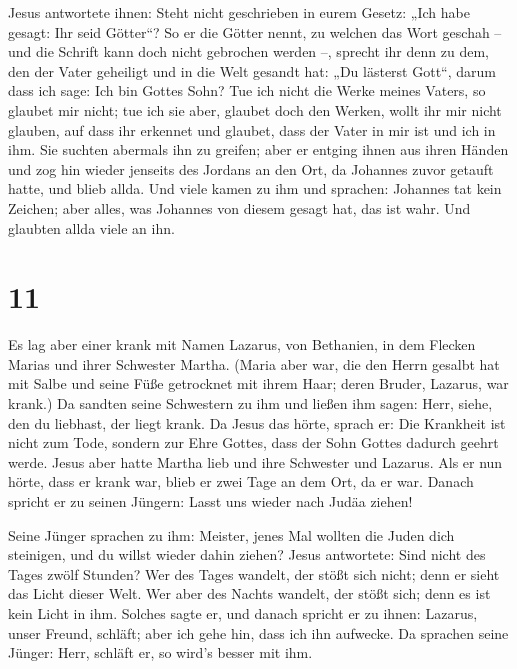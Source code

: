  Jesus antwortete ihnen: Steht nicht geschrieben in eurem
Gesetz: „Ich habe gesagt: Ihr seid Götter``?  So er die
Götter nennt, zu welchen das Wort geschah -- und die Schrift kann doch
nicht gebrochen werden --,  sprecht ihr denn zu dem, den
der Vater geheiligt und in die Welt gesandt hat: „Du lästerst Gott``,
darum dass ich sage: Ich bin Gottes Sohn?  Tue ich nicht
die Werke meines Vaters, so glaubet mir nicht;  tue ich
sie aber, glaubet doch den Werken, wollt ihr mir nicht glauben, auf dass
ihr erkennet und glaubet, dass der Vater in mir ist und ich in ihm.
 Sie suchten abermals ihn zu greifen; aber er entging
ihnen aus ihren Händen  und zog hin wieder jenseits des
Jordans an den Ort, da Johannes zuvor getauft hatte, und blieb allda.
 Und viele kamen zu ihm und sprachen: Johannes tat kein
Zeichen; aber alles, was Johannes von diesem gesagt hat, das ist wahr.
 Und glaubten allda viele an ihn.

\hypertarget{section-10}{%
\section{11}\label{section-10}}

 Es lag aber einer krank mit Namen Lazarus, von Bethanien,
in dem Flecken Marias und ihrer Schwester Martha.  (Maria
aber war, die den Herrn gesalbt hat mit Salbe und seine Füße getrocknet
mit ihrem Haar; deren Bruder, Lazarus, war krank.)  Da
sandten seine Schwestern zu ihm und ließen ihm sagen: Herr, siehe, den
du liebhast, der liegt krank.  Da Jesus das hörte, sprach
er: Die Krankheit ist nicht zum Tode, sondern zur Ehre Gottes, dass der
Sohn Gottes dadurch geehrt werde.  Jesus aber hatte Martha
lieb und ihre Schwester und Lazarus.  Als er nun hörte,
dass er krank war, blieb er zwei Tage an dem Ort, da er war.
 Danach spricht er zu seinen Jüngern: Lasst uns wieder
nach Judäa ziehen!

 Seine Jünger sprachen zu ihm: Meister, jenes Mal wollten
die Juden dich steinigen, und du willst wieder dahin ziehen?
 Jesus antwortete: Sind nicht des Tages zwölf Stunden? Wer
des Tages wandelt, der stößt sich nicht; denn er sieht das Licht dieser
Welt.  Wer aber des Nachts wandelt, der stößt sich; denn
es ist kein Licht in ihm.  Solches sagte er, und danach
spricht er zu ihnen: Lazarus, unser Freund, schläft; aber ich gehe hin,
dass ich ihn aufwecke.  Da sprachen seine Jünger: Herr,
schläft er, so wird's besser mit ihm.


